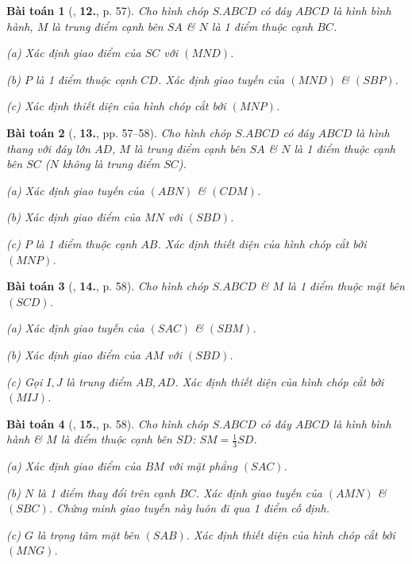 \documentclass{article}
\numberwithin{equation}{section}
\newtheorem{baitoan}{Bài toán}[section]
\begin{document}
\begin{baitoan}[\cite{TL_chuyen_Toan_Hinh_Hoc_11}, \textbf{12.}, p. 57]
	Cho hình chóp $S.ABCD$ có đáy $ABCD$ là hình bình hành, $M$ là trung điểm cạnh bên $SA$ \& $N$ là 1 điểm thuộc cạnh $BC$.
	\begin{enumerate*}
		\item[(a)] Xác định giao điểm của $SC$ với $(MND)$.
		\item[(b)] $P$ là 1 điểm thuộc cạnh $CD$. Xác định giao tuyến của $(MND)$ \& $(SBP)$.
		\item[(c)] Xác định thiết diện của hình chóp cắt bởi $(MNP)$.
	\end{enumerate*}
\end{baitoan}

\begin{baitoan}[\cite{TL_chuyen_Toan_Hinh_Hoc_11}, \textbf{13.}, pp. 57--58]
	Cho hình chóp $S.ABCD$ có đáy $ABCD$ là hình thang với đáy lớn $AD$, $M$ là trung điểm cạnh bên $SA$ \& $N$ là 1 điểm thuộc cạnh bên $SC$ ($N$ không là trung điểm $SC$).
	\begin{enumerate*}
		\item[(a)] Xác định giao tuyến của $(ABN)$ \& $(CDM)$.
		\item[(b)] Xác định giao điểm của $MN$ với $(SBD)$.
		\item[(c)] $P$ là 1 điểm thuộc cạnh $AB$. Xác định thiết diện của hình chóp cắt bởi $(MNP)$.
	\end{enumerate*}
\end{baitoan}

\begin{baitoan}[\cite{TL_chuyen_Toan_Hinh_Hoc_11}, \textbf{14.}, p. 58]
	Cho hình chóp $S.ABCD$ \& $M$ là 1 điểm thuộc mặt bên $(SCD)$.
	\begin{enumerate*}
		\item[(a)] Xác định giao tuyến của $(SAC)$ \& $(SBM)$.
		\item[(b)] Xác định giao điểm của $AM$ với $(SBD)$.
		\item[(c)] Gọi $I,J$ là trung điểm $AB,AD$. Xác định thiết diện của hình chóp cắt bởi $(MIJ)$.
	\end{enumerate*}
\end{baitoan}

\begin{baitoan}[\cite{TL_chuyen_Toan_Hinh_Hoc_11}, \textbf{15.}, p. 58]
	Cho hình chóp $S.ABCD$ có đáy $ABCD$ là hình bình hành \& $M$ là điểm thuộc cạnh bên $SD$: $SM = \frac{1}{3}SD$.
	\begin{enumerate*}
		\item[(a)] Xác định giao điểm của $BM$ với mặt phẳng $(SAC)$.
		\item[(b)] $N$ là 1 điểm thay đổi trên cạnh $BC$. Xác định giao tuyến của $(AMN)$ \& $(SBC)$. Chứng minh giao tuyến này luôn đi qua 1 điểm cố định.
		\item[(c)] $G$ là trọng tâm mặt bên $(SAB)$. Xác định thiết diện của hình chóp cắt bởi $(MNG)$.
	\end{enumerate*}
\end{baitoan}
\end{document}
